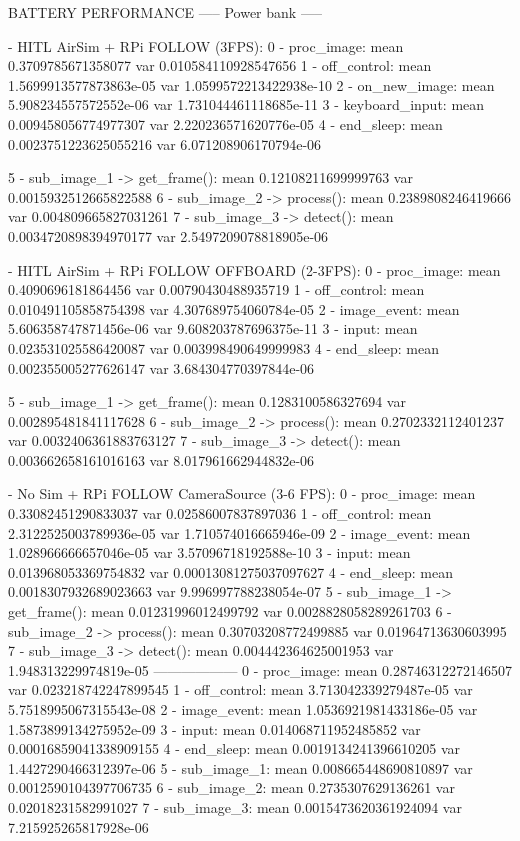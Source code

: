 BATTERY PERFORMANCE
----- Power bank -----

- HITL AirSim + RPi FOLLOW (3FPS):
0 - proc_image: mean 0.3709785671358077 var 0.010584110928547656
1 - off_control: mean 1.5699913577873863e-05 var 1.0599572213422938e-10
2 - on_new_image: mean 5.908234557572552e-06 var 1.731044461118685e-11
3 - keyboard_input: mean 0.009458056774977307 var 2.220236571620776e-05
4 - end_sleep: mean 0.0023751223625055216 var 6.071208906170794e-06

5 - sub_image_1 -> get_frame(): mean 0.12108211699999763 var 0.0015932512665822588
6 - sub_image_2 -> process(): mean 0.2389808246419666 var 0.004809665827031261
7 - sub_image_3 -> detect(): mean 0.0034720898394970177 var 2.5497209078818905e-06

- HITL AirSim + RPi FOLLOW OFFBOARD (2-3FPS):
0 - proc_image: mean 0.4090696181864456 var 0.00790430488935719
1 - off_control: mean 0.010491105858754398 var 4.307689754060784e-05
2 - image_event: mean 5.606358747871456e-06 var 9.608203787696375e-11
3 - input: mean 0.023531025586420087 var 0.003998490649999983
4 - end_sleep: mean 0.002355005277626147 var 3.684304770397844e-06

5 - sub_image_1 -> get_frame(): mean 0.1283100586327694 var 0.002895481841117628
6 - sub_image_2 -> process(): mean 0.2702332112401237 var 0.0032406361883763127
7 - sub_image_3 -> detect(): mean 0.003662658161016163 var 8.017961662944832e-06

- No Sim + RPi FOLLOW CameraSource (3-6 FPS):
0 - proc_image: mean 0.33082451290833037 var 0.02586007837897036
1 - off_control: mean 2.3122525003789936e-05 var 1.710574016665946e-09
2 - image_event: mean 1.028966666657046e-05 var 3.57096718192588e-10
3 - input: mean 0.013968053369754832 var 0.00013081275037097627
4 - end_sleep: mean 0.0018307932689023663 var 9.996997788238054e-07
5 - sub_image_1 -> get_frame(): mean 0.01231996012499792 var 0.0028828058289261703
6 - sub_image_2 -> process(): mean 0.30703208772499885 var 0.01964713630603995
7 - sub_image_3 -> detect(): mean 0.004442364625001953 var 1.948313229974819e-05
------------------
0 - proc_image: mean 0.28746312272146507 var 0.023218742247899545
1 - off_control: mean 3.713042339279487e-05 var 5.7518995067315543e-08
2 - image_event: mean 1.0536921981433186e-05 var 1.5873899134275952e-09
3 - input: mean 0.014068711952485852 var 0.00016859041338909155
4 - end_sleep: mean 0.0019134241396610205 var 1.4427290466312397e-06
5 - sub_image_1: mean 0.008665448690810897 var 0.0012590104397706735
6 - sub_image_2: mean 0.2735307629136261 var 0.02018231582991027
7 - sub_image_3: mean 0.0015473620361924094 var 7.215925265817928e-06

